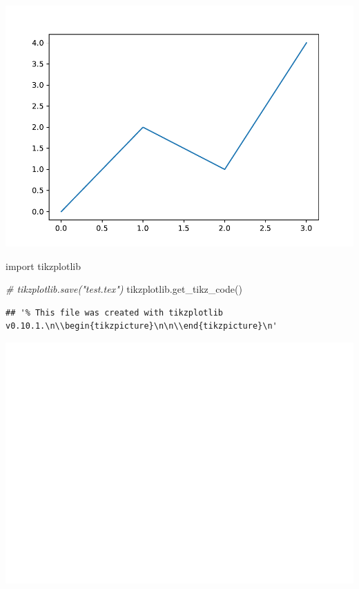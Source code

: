 \documentclass[
]{book}
\newenvironment{Shaded}{\begin{snugshade}}{\end{snugshade}}
\newcommand{\CommentTok}[1]{\textcolor[rgb]{0.56,0.35,0.01}{\textit{#1}}}
\newcommand{\ImportTok}[1]{#1}
\newcommand{\NormalTok}[1]{#1}
\theoremstyle{definition}
\theoremstyle{definition}
\theoremstyle{definition}
\theoremstyle{definition}
\theoremstyle{remark}
\begin{document}
\includegraphics{202401311000-TikZ_files/figure-latex/unnamed-chunk-168-1}

\begin{Shaded}
\begin{Highlighting}[]
\ImportTok{import}\NormalTok{ tikzplotlib}

\CommentTok{\# tikzplotlib.save("test.tex")}
\NormalTok{tikzplotlib.get\_tikz\_code()}
\end{Highlighting}
\end{Shaded}

\begin{verbatim}
## '% This file was created with tikzplotlib v0.10.1.\n\\begin{tikzpicture}\n\n\\end{tikzpicture}\n'
\end{verbatim}

\includegraphics{202401311000-TikZ_files/figure-latex/unnamed-chunk-168-2}
\end{document}
